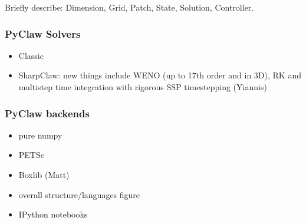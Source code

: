 Briefly describe: Dimension, Grid, Patch, State, Solution, Controller.

\subsubsection{PyClaw Solvers}
\begin{itemize}
    \item Classic
    \item SharpClaw: new things include WENO (up to 17th order and in 3D), RK and multistep
            time integration with rigorous SSP timestepping (Yiannis)
\end{itemize}

\subsubsection{PyClaw backends}
\begin{itemize}
    \item pure numpy
    \item PETSc
    \item Boxlib (Matt)
\end{itemize}

\begin{itemize}
    \item overall structure/languages figure
    \item IPython notebooks
\end{itemize}
